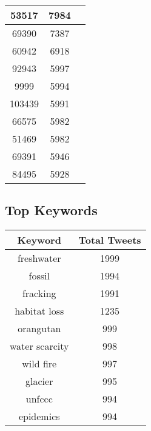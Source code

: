 \documentclass{article}\usepackage[T1]{fontenc}
\begin{document}
\begin{tabular}{|c|c|c|}
 \hline
53517 & 7984\\ 
 \hline
69390 & 7387\\ 
 \hline
60942 & 6918\\ 
 \hline
92943 & 5997\\ 
 \hline
9999 & 5994\\ 
 \hline
103439 & 5991\\ 
 \hline
66575 & 5982\\ 
 \hline
51469 & 5982\\ 
 \hline
69391 & 5946\\ 
 \hline
84495 & 5928\\ 
 \hline
\end{tabular}\subsection*{Top Keywords}\begin{tabular}{|c|c|}         \hline         Keyword & Total Tweets \\ 
 \hline
freshwater & 1999\\ 
 \hline
fossil & 1994\\ 
 \hline
fracking & 1991\\ 
 \hline
habitat loss & 1235\\ 
 \hline
orangutan & 999\\ 
 \hline
water scarcity & 998\\ 
 \hline
wild fire & 997\\ 
 \hline
glacier & 995\\ 
 \hline
unfccc & 994\\ 
 \hline
epidemics & 994\\ 
 \hline
\end{tabular}
\end{document}
